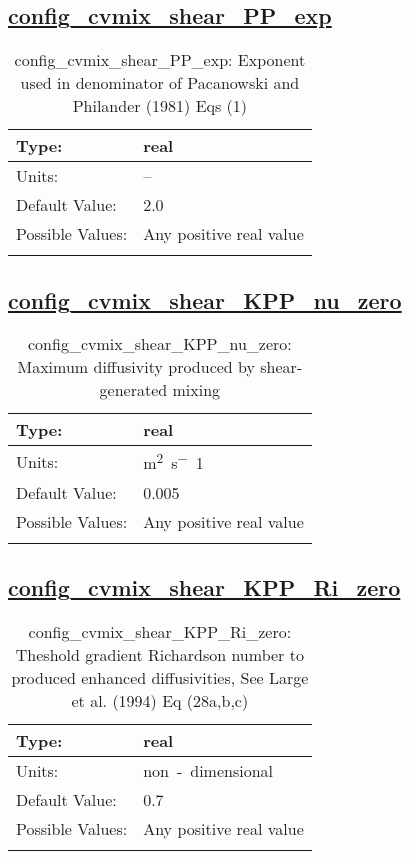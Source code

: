 \subsection[config\_cvmix\_shear\_PP\_exp]{\hyperref[sec:nm_tab_cvmix]{config\_cvmix\_shear\_PP\_exp}}
\label{subsec:nm_sec_config_cvmix_shear_PP_exp}
\begin{center}
\begin{longtable}{| p{2.0in} || p{4.0in} |}
    \hline
    Type: & real \\
    \hline
    Units: & -- \\
    \hline
    Default Value: & 2.0 \\
    \hline
    Possible Values: & Any positive real value \\
    \hline
    \caption{config\_cvmix\_shear\_PP\_exp: Exponent used in denominator of Pacanowski and Philander (1981) Eqs (1)}
\end{longtable}
\end{center}
\subsection[config\_cvmix\_shear\_KPP\_nu\_zero]{\hyperref[sec:nm_tab_cvmix]{config\_cvmix\_shear\_KPP\_nu\_zero}}
\label{subsec:nm_sec_config_cvmix_shear_KPP_nu_zero}
\begin{center}
\begin{longtable}{| p{2.0in} || p{4.0in} |}
    \hline
    Type: & real \\
    \hline
    Units: & \si{m^2.s^-1} \\
    \hline
    Default Value: & 0.005 \\
    \hline
    Possible Values: & Any positive real value \\
    \hline
    \caption{config\_cvmix\_shear\_KPP\_nu\_zero: Maximum diffusivity produced by shear-generated mixing}
\end{longtable}
\end{center}
\subsection[config\_cvmix\_shear\_KPP\_Ri\_zero]{\hyperref[sec:nm_tab_cvmix]{config\_cvmix\_shear\_KPP\_Ri\_zero}}
\label{subsec:nm_sec_config_cvmix_shear_KPP_Ri_zero}
\begin{center}
\begin{longtable}{| p{2.0in} || p{4.0in} |}
    \hline
    Type: & real \\
    \hline
    Units: & \si{non-dimensional} \\
    \hline
    Default Value: & 0.7 \\
    \hline
    Possible Values: & Any positive real value \\
    \hline
    \caption{config\_cvmix\_shear\_KPP\_Ri\_zero: Theshold gradient Richardson number to produced enhanced diffusivities, See Large et al. (1994) Eq (28a,b,c)}
\end{longtable}
\end{center}
